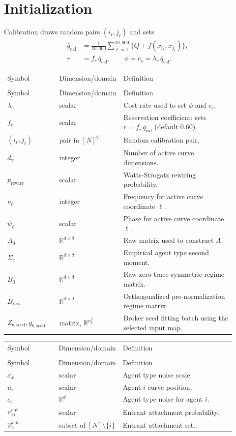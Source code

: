 \documentclass[11pt]{article}
\makeatletter
\newcommand{\R}{\mathbb{R}}
\newcommand{\procInitialize}{Initialize}
\newcommand{\procInitializeAgent}{InitializeAgent}
\newenvironment{localvartable}[1]{%
\begingroup
\small
\setlength{\tabcolsep}{4pt}
\renewcommand{\arraystretch}{1.08}
\begin{longtable}{>{\raggedright\arraybackslash}p{0.23\linewidth}
                >{\raggedright\arraybackslash}p{0.18\linewidth}
                >{\raggedright\arraybackslash}p{0.51\linewidth}}
\toprule
\multicolumn{3}{@{}l}{\textit{Local variables for #1}}\\
\midrule
Symbol & Dimension/domain & Definition \\
\midrule
\endfirsthead
\toprule
\multicolumn{3}{@{}l}{\textit{Local variables for #1 (continued)}}\\
\midrule
Symbol & Dimension/domain & Definition \\
\midrule
\endhead
}{%
\bottomrule
\end{longtable}
\endgroup
}
\makeatother
\begin{document}
\section{Initialization}

Calibration draws random pairs $(i_\ell,j_\ell)$ and sets
\[
\begin{aligned}
\bar q_{\mathrm{cal}}
&=\frac{1}{10{,}000}\sum_{\ell=1}^{10{,}000} \{Q+f(x_{i_\ell},x_{j_\ell})\},\\
r&=f_r\,\bar q_{\mathrm{cal}},
\qquad
\phi=c_s=\lambda_c\,\bar q_{\mathrm{cal}}.
\end{aligned}
\]

\begin{localvartable}{\procInitialize}
$\lambda_c$ & scalar & Cost rate used to set $\phi$ and $c_s$. \\
$f_r$ & scalar & Reservation coefficient; sets $r=f_r\,\bar q_{\mathrm{cal}}$ (default 0.60). \\
$(i_\ell,j_\ell)$ & pair in $[N]^2$ & Random calibration pair. \\
$d_\gamma$ & integer & Number of active curve dimensions. \\
$p_{\mathrm{rewire}}$ & scalar & Watts-Strogatz rewiring probability. \\
$\nu_\ell$ & integer & Frequency for active curve coordinate $\ell$. \\
$\psi_\ell$ & scalar & Phase for active curve coordinate $\ell$. \\
$A_0$ & $\R^{d\times d}$ & Raw matrix used to construct $A$. \\
$\Sigma_x$ & $\R^{d\times d}$ & Empirical agent type second moment. \\
$B_0$ & $\R^{d\times d}$ & Raw zero-trace symmetric regime matrix. \\
$B_{\mathrm{raw}}$ & $\R^{d\times d}$ & Orthogonalized pre-normalization regime matrix. \\
$Z_{b,\mathrm{seed}},y_{b,\mathrm{seed}}$ & matrix, $\R^{n_b^0}$ & Broker seed fitting batch using the selected input map. \\
\end{localvartable}

\begin{localvartable}{\procInitializeAgent}
$\sigma_x$ & scalar & Agent type noise scale. \\
$u_i$ & scalar & Agent $i$ curve position. \\
$\epsilon_i$ & $\R^d$ & Agent type noise for agent $i$. \\
$\pi_{ij}^{\mathrm{ent}}$ & scalar & Entrant attachment probability. \\
$\mathcal V_i^{\mathrm{ent}}$ & subset of $[N]\setminus\{i\}$ & Entrant attachment set. \\
\end{localvartable}
\end{document}
